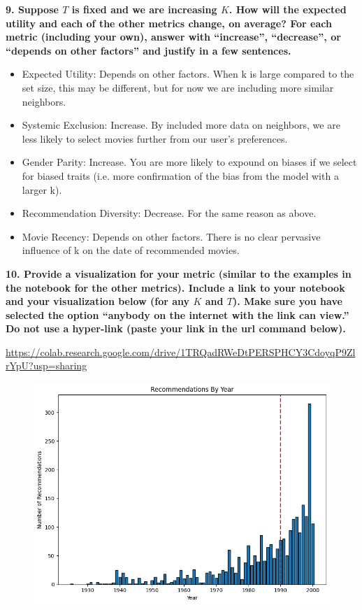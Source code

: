 \documentclass{article}
\begin{document}
\textbf{9. Suppose $T$ is fixed and we are increasing $K$. How will the expected utility and each of the other metrics change, on average? For each metric (including your own), answer with ``increase'', ``decrease'', or ``depends on other factors'' and justify in a few sentences.}
\bigskip
\begin{mdframed}
\begin{itemize}
    \item Expected Utility: Depends on other factors. When k is large compared to the set size, this may be different, but for now we are including more similar neighbors.
    \item Systemic Exclusion: Increase. By included more data on neighbors, we are less likely to select movies further from our user's preferences. 
    \item Gender Parity: Increase. You are more likely to expound on biases if we select for biased traits (i.e. more confirmation of the bias from the model with a larger k).
    \item Recommendation Diversity: Decrease. For the same reason as above. 
    \item Movie Recency: Depends on other factors. There is no clear pervasive influence of k on the date of recommended movies. 
\end{itemize}
\end{mdframed}
\bigskip

\textbf{10. Provide a visualization for your metric (similar to the examples in the notebook for the other metrics). Include a link to your notebook and your visualization below (for any $K$ and $T$). Make sure you have selected the option ``anybody on the internet with the link can view.'' Do not use a hyper-link (paste your link in the url command below).}

\bigskip
\begin{mdframed}
\url{https://colab.research.google.com/drive/1TRQadRWeDtPERSPHCY3CdoyqP9ZlrYpU?usp=sharing} %

\end{mdframed}
\bigskip

\begin{figure}[h!]
\centering
\includegraphics[width=0.6\linewidth]{image.png}
\end{figure}
\end{document}
